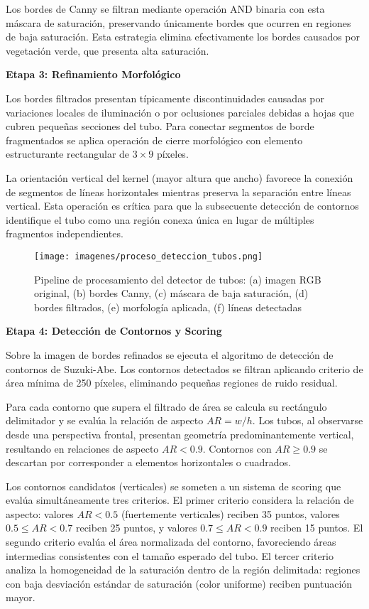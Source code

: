 Los bordes de Canny se filtran mediante operación AND binaria con esta máscara de saturación, preservando únicamente bordes que ocurren en regiones de baja saturación. Esta estrategia elimina efectivamente los bordes causados por vegetación verde, que presenta alta saturación.

\textbf{Etapa 3: Refinamiento Morfológico}

Los bordes filtrados presentan típicamente discontinuidades causadas por variaciones locales de iluminación o por oclusiones parciales debidas a hojas que cubren pequeñas secciones del tubo. Para conectar segmentos de borde fragmentados se aplica operación de cierre morfológico con elemento estructurante rectangular de $3 \times 9$ píxeles.

La orientación vertical del kernel (mayor altura que ancho) favorece la conexión de segmentos de líneas horizontales mientras preserva la separación entre líneas vertical. Esta operación es crítica para que la subsecuente detección de contornos identifique el tubo como una región conexa única en lugar de múltiples fragmentos independientes.

\begin{figure}[h]
\centering
\texttt{[image: imagenes/proceso\_deteccion\_tubos.png]}
\caption{Pipeline de procesamiento del detector de tubos: (a) imagen RGB original, (b) bordes Canny, (c) máscara de baja saturación, (d) bordes filtrados, (e) morfología aplicada, (f) líneas detectadas}
\label{fig:proceso_tubos}
\end{figure}

\textbf{Etapa 4: Detección de Contornos y Scoring}

Sobre la imagen de bordes refinados se ejecuta el algoritmo de detección de contornos de Suzuki-Abe. Los contornos detectados se filtran aplicando criterio de área mínima de 250 píxeles, eliminando pequeñas regiones de ruido residual.

Para cada contorno que supera el filtrado de área se calcula su rectángulo delimitador y se evalúa la relación de aspecto $AR = w/h$. Los tubos, al observarse desde una perspectiva frontal, presentan geometría predominantemente vertical, resultando en relaciones de aspecto $AR < 0.9$. Contornos con $AR \geq 0.9$ se descartan por corresponder a elementos horizontales o cuadrados.

Los contornos candidatos (verticales) se someten a un sistema de scoring que evalúa simultáneamente tres criterios. El primer criterio considera la relación de aspecto: valores $AR < 0.5$ (fuertemente verticales) reciben 35 puntos, valores $0.5 \leq AR < 0.7$ reciben 25 puntos, y valores $0.7 \leq AR < 0.9$ reciben 15 puntos. El segundo criterio evalúa el área normalizada del contorno, favoreciendo áreas intermedias consistentes con el tamaño esperado del tubo. El tercer criterio analiza la homogeneidad de la saturación dentro de la región delimitada: regiones con baja desviación estándar de saturación (color uniforme) reciben puntuación mayor.

